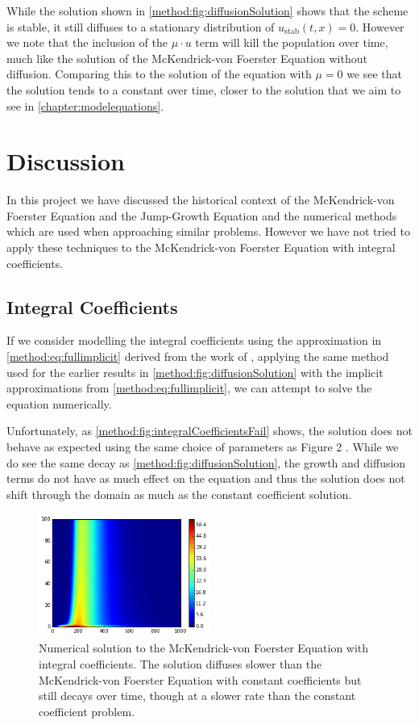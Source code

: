 \documentclass[../main.tex]{subfiles}
\begin{document}
  While the solution shown in \autoref{method:fig:diffusionSolution} shows that the scheme is stable, it still diffuses to a stationary distribution of $u_{\mathrm{stab}}(t, x) = 0$. However we note that the inclusion of the $\mu \cdot u$ term will kill the population over time, much like the solution of the McKendrick-von Foerster Equation without diffusion. Comparing this to the solution of the equation with $\mu = 0$ we see that the solution tends to a constant over time, closer to the solution that we aim to see in \autoref{chapter:modelequations}.

  \chapter{Discussion}

  In this project we have discussed the historical context of the McKendrick-von Foerster Equation and the Jump-Growth Equation and the numerical methods which are used when approaching similar problems. However we have not tried to apply these techniques to the McKendrick-von Foerster Equation with integral coefficients.

  \section{Integral Coefficients}
  If we consider modelling the integral coefficients using the approximation in \autoref{method:eq:fullimplicit} derived from the work of \cite{hartvig2011}, applying the same method used for the earlier results in \autoref{method:fig:diffusionSolution} with the implicit approximations from \autoref{method:eq:fullimplicit}, we can attempt to solve the equation numerically.

  Unfortunately, as \autoref{method:fig:integralCoefficientsFail} shows, the solution does not behave as expected using the same choice of parameters as Figure 2 \cite{datta2011}. While we do see the same decay as \autoref{method:fig:diffusionSolution}, the growth and diffusion terms do not have as much effect on the equation and thus the solution does not shift through the domain as much as the constant coefficient solution.

  \begin{figure}[htb]
    \centering
    \includegraphics[width=0.5\textwidth]{_assets/integralCoeffsFail.png}
    \caption{\label{method:fig:integralCoefficientsFail} Numerical solution to the McKendrick-von Foerster Equation with integral coefficients. The solution diffuses slower than the McKendrick-von Foerster Equation with constant coefficients but still decays over time, though at a slower rate than the constant coefficient problem.}
  \end{figure}
\end{document}
